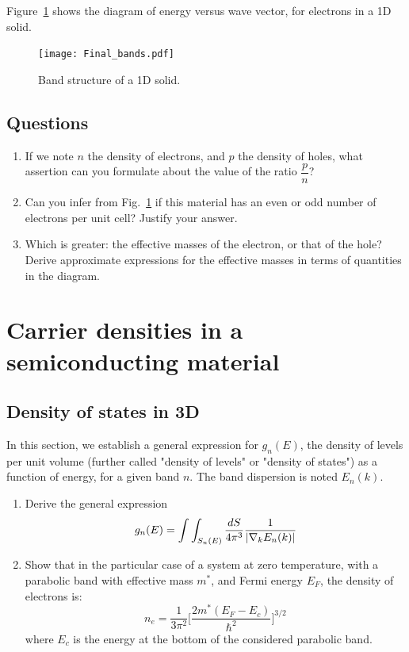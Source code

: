 Figure~\ref{fig:bands} shows the diagram of energy versus wave vector, for
electrons in a 1D solid.

\begin{figure}[h]
  \centering
  \texttt{[image: Final\_bands.pdf]}
  \caption{Band structure of a 1D solid.\label{fig:bands}}
\end{figure}

\subsection{Questions}

\begin{enumerate}[label=(\roman*)]
\item If we note $n$ the density of electrons, and $p$ the density of
  holes, what assertion can you formulate about the value of the ratio
  $\dfrac{p}{n}$?
\item Can you infer from Fig.~\ref{fig:bands} if this material has an
  even or odd number of electrons per unit cell? Justify your answer.
\item Which is greater: the effective masses of the electron, or that
  of the hole? Derive approximate expressions for the effective masses
  in terms of quantities in the diagram.
\end{enumerate}

\section{Carrier densities in a semiconducting material}

\subsection{Density of states in 3D}\label{section:DOS}

In this section, we establish a general expression for $g_n(E)$, the density of levels
per unit volume (further called "density of levels" or "density of
states") as a function of energy, for a given band $n$. The band dispersion is noted
$E_n(k)$.

\begin{enumerate}[label=(\roman*)]
\item Derive the general expression $$g_n(E) = \int\int_{S_n(E)} \dfrac{dS}{4
    \pi^3} \dfrac{1}{\left| \nabla_k E_n(k) \right|}$$
\item Show that in the particular case of a system at zero
  temperature, with a parabolic band with effective mass $m^{*}$, and
  Fermi energy $E_F$, the density of electrons is: $$n_e =
  \dfrac{1}{3 \pi^2} \biggl[\dfrac{2 m^{*} (E_F-E_c)}{ \hbar^2} \biggr]^{3/2}$$
where $E_c$ is the energy at the bottom of the considered parabolic band.
\end{enumerate}

